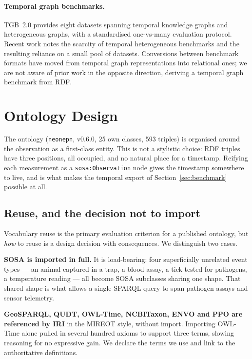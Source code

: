 \paragraph{Temporal graph benchmarks.}
TGB~2.0 provides eight datasets spanning temporal knowledge graphs and
heterogeneous graphs, with a standardised one-vs-many evaluation protocol.
Recent work notes the scarcity of temporal heterogeneous benchmarks and the
resulting reliance on a small pool of datasets. Conversions between benchmark
formats have moved from temporal graph representations into relational ones; we
are not aware of prior work in the opposite direction, deriving a temporal
graph benchmark from RDF.

\section{Ontology Design}
\label{sec:ontology}

The ontology (\texttt{neonepn}, v0.6.0, 25 own classes, 593 triples) is
organised around the observation as a first-class entity. This is not a
stylistic choice: RDF triples have three positions, all occupied, and no
natural place for a timestamp. Reifying each measurement as a
\texttt{sosa:Observation} node gives the timestamp somewhere to live, and is
what makes the temporal export of Section~\ref{sec:benchmark} possible at all.

\subsection{Reuse, and the decision not to import}

Vocabulary reuse is the primary evaluation criterion for a published ontology,
but \emph{how} to reuse is a design decision with consequences. We distinguish
two cases.

\textbf{SOSA is imported in full.} It is load-bearing: four superficially
unrelated event types --- an animal captured in a trap, a blood assay, a tick
tested for pathogens, a temperature reading --- all become SOSA subclasses
sharing one shape. That shared shape is what allows a single SPARQL query to
span pathogen assays and sensor telemetry.

\textbf{GeoSPARQL, QUDT, OWL-Time, NCBITaxon, ENVO and PPO are referenced by
IRI} in the MIREOT style, without import. Importing OWL-Time alone pulled in
several hundred axioms to support three terms, slowing reasoning for no
expressive gain. We declare the terms we use and link to the authoritative
definitions.

